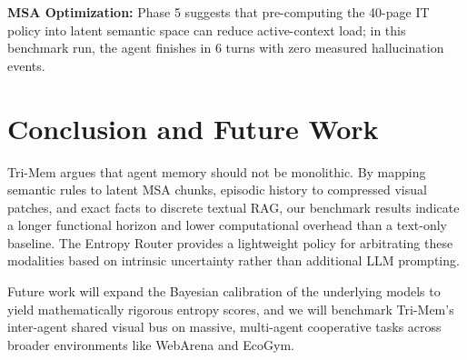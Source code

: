 \documentclass[conference]{IEEEtran}
\begin{document}
\textbf{MSA Optimization:} Phase 5 suggests that pre-computing the 40-page IT policy into latent semantic space can reduce active-context load; in this benchmark run, the agent finishes in 6 turns with zero measured hallucination events.

\section{Conclusion and Future Work}
Tri-Mem argues that agent memory should not be monolithic. By mapping semantic rules to latent MSA chunks, episodic history to compressed visual patches, and exact facts to discrete textual RAG, our benchmark results indicate a longer functional horizon and lower computational overhead than a text-only baseline. The Entropy Router provides a lightweight policy for arbitrating these modalities based on intrinsic uncertainty rather than additional LLM prompting. 

Future work will expand the Bayesian calibration of the underlying models to yield mathematically rigorous entropy scores, and we will benchmark Tri-Mem's inter-agent shared visual bus on massive, multi-agent cooperative tasks across broader environments like WebArena and EcoGym.
\end{document}
